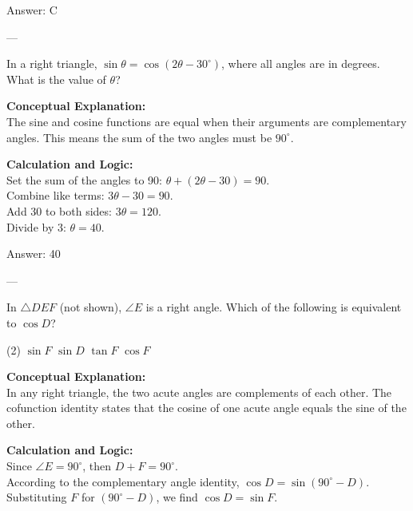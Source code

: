 \documentclass[11pt,paper=a4,answers]{exam}
\begin{document}
\begin{questions}
\begin{solution}
\vspace{15pt}
Answer: \colorbox{yellow!100}{C}
\end{solution}

---

\question
In a right triangle, $\sin \theta = \cos(2\theta - 30^\circ)$, where all angles are in degrees. What is the value of $\theta$?

\begin{solution}
\textbf{Conceptual Explanation:} \\
The sine and cosine functions are equal when their arguments are complementary angles. This means the sum of the two angles must be $90^\circ$.

\vspace{10pt}
\textbf{Calculation and Logic:} \\
Set the sum of the angles to 90: $\theta + (2\theta - 30) = 90$. \\
Combine like terms: $3\theta - 30 = 90$. \\
Add 30 to both sides: $3\theta = 120$. \\
Divide by 3: $\theta = 40$.

\vspace{15pt}
Answer: \colorbox{yellow!100}{40}
\end{solution}

---

\question
In $\triangle DEF$ (not shown), $\angle E$ is a right angle. Which of the following is equivalent to $\cos D$?
\begin{tasks}(2)
    \task $\sin F$
    \task $\sin D$
    \task $\tan F$
    \task $\cos F$
\end{tasks}

\begin{solution}
\textbf{Conceptual Explanation:} \\
In any right triangle, the two acute angles are complements of each other. The cofunction identity states that the cosine of one acute angle equals the sine of the other.

\vspace{10pt}
\textbf{Calculation and Logic:} \\
Since $\angle E = 90^\circ$, then $D + F = 90^\circ$. \\
According to the complementary angle identity, $\cos D = \sin(90^\circ - D)$. \\
Substituting $F$ for $(90^\circ - D)$, we find $\cos D = \sin F$.


\end{solution}
\end{questions}
\end{document}
